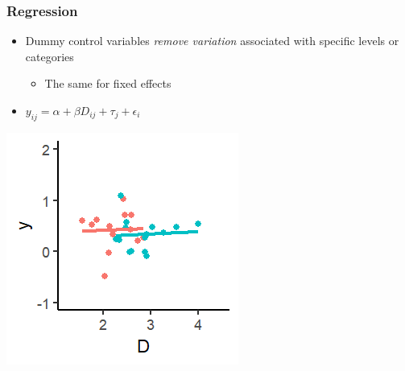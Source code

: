 \documentclass[xcolor=x11names,compress]{beamer}\usepackage[]{graphicx}\usepackage[]{color}
\makeatletter
\def\maxwidth{ %
  \ifdim\Gin@nat@width>\linewidth
    \linewidth
  \else
    \Gin@nat@width
  \fi
}
\newenvironment{knitrout}{}{} %
\renewcommand{\(}{\begin{columns}}
\renewcommand{\)}{\end{columns}}
\newcommand{\<}[1]{\begin{column}{#1}}
\renewcommand{\>}{\end{column}}
\makeatother
\begin{document}
\begin{frame}
\frametitle{Regression}
\begin{itemize}
\item Dummy control variables \textit{remove variation} associated with specific levels or categories
\begin{itemize}
\item The same for fixed effects
\end{itemize}
\item $y_{ij} = \alpha + \beta D_{ij} + \tau_j + \epsilon_i$
\end{itemize}
\begin{multicols}{2}
\begin{knitrout}
\color{fgcolor}
\includegraphics[width=\maxwidth]{figure/graph_ols_FE4-1} 

\end{knitrout}
\columnbreak
\end{multicols}
\end{frame}
\end{document}

